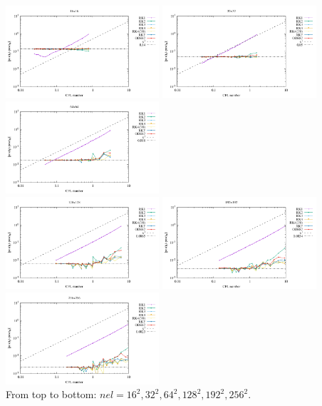 \begin{center}
\includegraphics[width=5.7cm]{python_codes/fieldstone_122/results/exp1_16/errors2.pdf}
\includegraphics[width=5.7cm]{python_codes/fieldstone_122/results/exp1_32/errors2.pdf}
\includegraphics[width=5.7cm]{python_codes/fieldstone_122/results/exp1_64/errors2.pdf}\\
\includegraphics[width=5.7cm]{python_codes/fieldstone_122/results/exp1_128/errors2.pdf}
\includegraphics[width=5.7cm]{python_codes/fieldstone_122/results/exp1_192/errors2.pdf}
\includegraphics[width=5.7cm]{python_codes/fieldstone_122/results/exp1_256/errors2.pdf}\\
{\captionfont From top to bottom: $nel=16^2,32^2,64^2,128^2,192^2,256^2$.}
\end{center}

